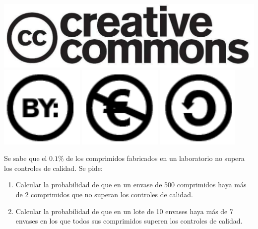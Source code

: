 \documentclass[aspectratio=149,10pt,xcolor=dvipsnames,t]{beamer}
\begin{document}
\begin{frame}[c]
\begin{center}
\biskip
\includegraphics[scale=0.07]{img/cc-logo}
\includegraphics[scale=0.2]{img/cc-by}
\includegraphics[scale=0.2]{img/cc-e}
\includegraphics[scale=0.2]{img/cc-c}
\end{center}
\end{frame}

\begin{frame}[c]
Se sabe que el $0.1\%$ de los comprimidos fabricados en un laboratorio no supera los controles de calidad. 
Se pide:
\begin{enumerate}
\item Calcular la probabilidad de que en un envase de 500 comprimidos haya más de 2 comprimidos que no superan los controles de calidad.
\item Calcular la probabilidad de que en un lote de 10 envases haya más de 7 envases en los que todos sus comprimidos superen los controles de calidad. 
\end{enumerate}
\end{frame}
\end{document}
